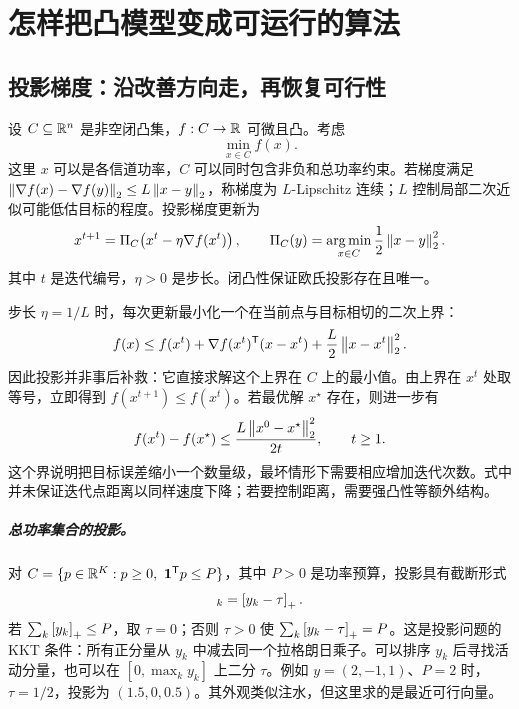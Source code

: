 \chapter{怎样把凸模型变成可运行的算法}
\label{chap:convex-algorithms}

\section{投影梯度：沿改善方向走，再恢复可行性}
设 $C\subseteq\mathbb R^n$ 是非空闭凸集，$f:C\to\mathbb R$ 可微且凸。考虑
\begin{equation}
 \min_{x\in C} f(x).
 \label{eq:pg-problem}
\end{equation}
这里 $x$ 可以是各信道功率，$C$ 可以同时包含非负和总功率约束。若梯度满足 $\left\lVert \nabla f(x)-\nabla f(y)\right\rVert_2\le L\left\lVert x-y\right\rVert_2$，称梯度为 $L$-Lipschitz 连续；$L$ 控制局部二次近似可能低估目标的程度。投影梯度更新为
\begin{equation}
 x^{t+1}=\Pi_C\!\left(x^t-\eta\nabla f(x^t)\right),\qquad
 \Pi_C(y)=\operatorname*{arg\,min}_{x\in C}\frac12\left\lVert x-y\right\rVert_2^2.
 \label{eq:pg-update}
\end{equation}
其中 $t$ 是迭代编号，$\eta>0$ 是步长。闭凸性保证欧氏投影存在且唯一。

步长 $\eta=1/L$ 时，每次更新最小化一个在当前点与目标相切的二次上界：
\begin{equation}
 f(x)\le f(x^t)+\nabla f(x^t)^\mathsf T(x-x^t)
          +\frac L2\left\lVert x-x^t\right\rVert_2^2.
 \label{eq:descent-lemma}
\end{equation}
因此投影并非事后补救：它直接求解这个上界在 $C$ 上的最小值。由上界在 $x^t$ 处取等号，立即得到 $f(x^{t+1})\le f(x^t)$。若最优解 $x^\star$ 存在，则进一步有\cite{boyd2004}
\begin{equation}
 f(x^t)-f(x^\star)\le\frac{L\left\lVert x^0-x^\star\right\rVert_2^2}{2t},\qquad t\ge1.
 \label{eq:pg-rate}
\end{equation}
这个界说明把目标误差缩小一个数量级，最坏情形下需要相应增加迭代次数。式中并未保证迭代点距离以同样速度下降；若要控制距离，需要强凸性等额外结构。

\paragraph{总功率集合的投影。}
对 $C=\{p\in\mathbb R^K:p\ge0,\ \mathbf 1^\mathsf T p\le P\}$，其中 $P>0$ 是功率预算，投影具有截断形式
\begin{equation}
 [\Pi_C(y)]_k=\pos{y_k-\tau}.
 \label{eq:simplex-projection}
\end{equation}
若 $\sum_k\left[y_k\right]_+\le P$，取 $\tau=0$；否则 $\tau>0$ 使 $\sum_k\left[y_k-\tau\right]_+=P$。这是投影问题的 KKT 条件：所有正分量从 $y_k$ 中减去同一个拉格朗日乘子。可以排序 $y_k$ 后寻找活动分量，也可以在 $[0,\max_k y_k]$ 上二分 $\tau$。例如 $y=(2,-1,1)$、$P=2$ 时，$\tau=1/2$，投影为 $(1.5,0,0.5)$。其外观类似注水，但这里求的是最近可行向量。

